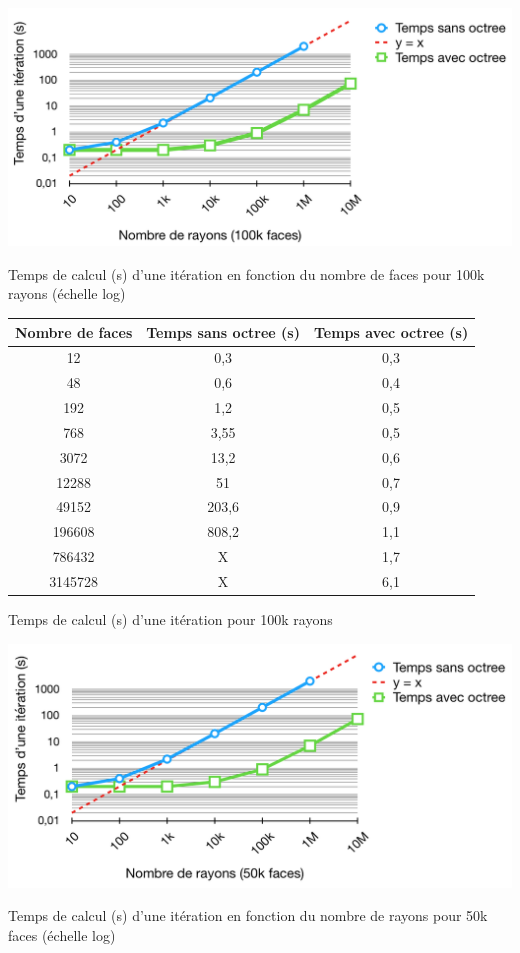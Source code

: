  \begin{figureth}
	\includegraphics[width=\linewidth]{images/complexite1}
	\caption{Temps de calcul (s) d'une itération en fonction du nombre de faces pour 100k rayons (échelle log)}
	\label{complexite1}
\end{figureth}

\begin{tableth}
	\begin{tabular}{| c | c | c |}
			\hline
		Nombre de faces & Temps \textbf{sans} \gls{octree} (s) & Temps \textbf{avec} \gls{octree} (s)\\
		  \hline
		  \hline
		   12 &0,3&	0,3 \\
		   \hline
		48 &0,6	&0,4 \\
		   \hline
		192 & 1,2	&0,5\\
		   \hline
		768 & 3,55&	0,5\\
		   \hline
		3072 & 13,2	&0,6\\
		   \hline
		12288 &51	&0,7 \\
		     \hline
		     49152 & 203,6	&0,9\\
		   \hline
		196608 & 808,2	&1,1\\
		\hline
		786432 & X & 1,7 \\
		\hline
		3145728 & X & 6,1 \\
		\hline
	 \end{tabular}
	\caption{Temps de calcul (s) d'une itération pour 100k rayons}
	\label{tabComplexite1}
\end{tableth}

\clearpage

 \begin{figureth}
	\includegraphics[width=\linewidth]{images/complexite2}
	\caption{Temps de calcul (s) d'une itération en fonction du nombre de rayons pour 50k faces (échelle log)}
	\label{complexite2}
\end{figureth}

